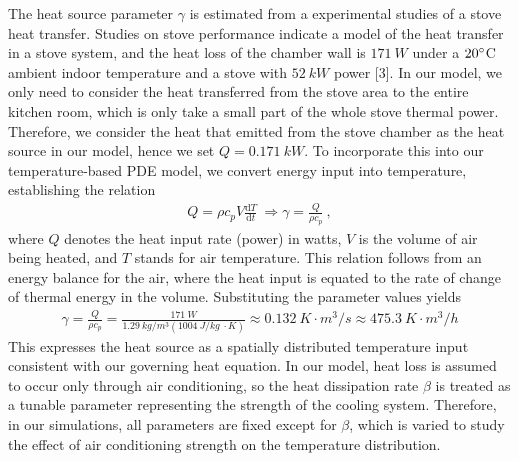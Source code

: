 \documentclass{article}
\begin{document}
\vspace{3mm}

\noindent The heat source parameter $\gamma$ is estimated from a experimental studies of a stove heat transfer. Studies on stove performance indicate a model of the heat transfer in a stove system, and the heat loss of the chamber wall is $171 \ W$ under a $20 \degree$C ambient indoor temperature and a stove with $52 \ kW$ power [3]. In our model, we only need to consider the heat transferred from the stove area to the entire kitchen room, which is only take a small part of the whole stove thermal power. Therefore, we consider the heat that emitted from the stove chamber as the heat source in our model, hence we set $Q = 0.171 \ kW$.
To incorporate this into our temperature-based PDE model, we convert energy input into temperature, establishing the relation 
\begin{align*}
    Q = \rho c_p V \frac{\mathrm{d}T}{\mathrm{d}t} \ \Rightarrow \gamma = \frac{Q}{\rho c_p} \ , \tag{4.1}
\end{align*}
where $Q$ denotes the heat input rate (power) in watts, $V$ is the volume of air being heated, and $T$ stands for air temperature. This relation follows from an energy balance for the air, where the heat input is equated to the rate of change of thermal energy in the volume. Substituting the parameter values yields 
\begin{align*}
    \gamma = \frac{Q}{\rho c_p} = \frac{171\ W}{1.29\ kg/m^3(1004\ J/kg\ \cdotp K)} \approx 0.132\ K \cdotp m^3/s \approx  475.3 \ K \cdotp m^3/h
\end{align*}
This expresses the heat source as a spatially distributed temperature input consistent with our governing heat equation. In our model, heat loss is assumed to occur only through air conditioning, so the heat dissipation rate $\beta$ is treated as a tunable parameter representing the strength of the cooling system. Therefore, in our simulations, all parameters are fixed except for $\beta$, which is varied to study the effect of air conditioning strength on the temperature distribution.
\end{document}
